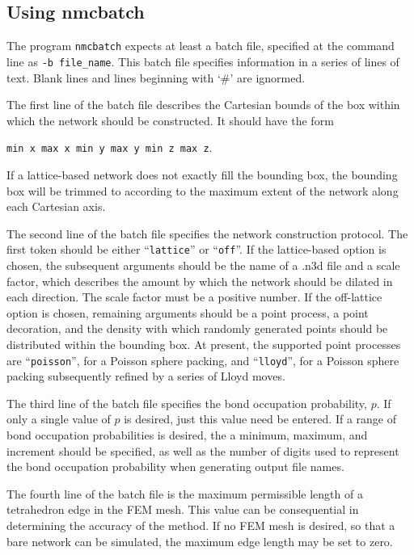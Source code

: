 \documentclass{article}
\begin{document}
\subsection{Using nmcbatch}

The program \texttt{nmcbatch} expects at least a batch file, specified at
the command line as \texttt{-b file\_name}. This batch file specifies
information in a series of lines of text. Blank lines and lines beginning with
`\#' are ignormed.

The first line of the batch file describes the Cartesian bounds of the box
within which the network should be constructed. It should have the form
\begin{center}
\texttt{min x max x min y max y min z max z}.
\end{center}
If a lattice-based network does not exactly fill the bounding box, the
bounding box will be trimmed to according to the maximum extent of the network
along each Cartesian axis.

The second line of the batch file specifies the network construction protocol.
The first token should be either ``\texttt{lattice}'' or ``\texttt{off}''. If
the lattice-based option is chosen, the subsequent arguments should be the
name of a .n3d file and a scale factor, which describes the amount by which
the network should be dilated in each direction. The scale factor must be a
positive number. If the off-lattice option is chosen, remaining arguments
should be a point process, a point decoration, and the density with which
randomly generated points should be distributed within the bounding box.
At present, the supported point processes are ``\texttt{poisson}'', for a
Poisson sphere packing, and ``\texttt{lloyd}'', for a Poisson sphere packing
subsequently refined by a series of Lloyd moves.

The third line of the batch file specifies the bond occupation probability, $p$.
If only a single value of $p$ is desired, just this value need be entered. If
a range of bond occupation probabilities is desired, the a minimum, maximum,
and increment should be specified, as well as the number of digits used to
represent the bond occupation probability when generating output file names.

The fourth line of the batch file is the maximum permissible length of a 
tetrahedron edge in the FEM mesh. This value can be consequential in
determining the accuracy of the method. If no FEM mesh is desired, so that
a bare network can be simulated, the maximum edge length may be set to zero.
\end{document}
